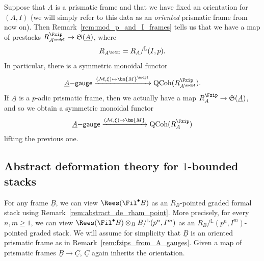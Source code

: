 \documentclass[10pt]{amsart}
\begin{document}
\begin{remark}
\label{rem:fzips_from_A_gauges}
Suppose that $\underline{A}$ is a prismatic frame and that we have fixed an orientation for $(A,I)$ (we will simply refer to this data as an \emph{oriented} prismatic frame from now on). Then Remark~\ref{rem:mod_p_and_I_frames} tells us that we have a map of prestacks $R_{A^\modpI}^{\Fzip}\to \mathfrak{S}(\underline{A})$, where 
\[
R_{A^\modpI} = R_A/{}^{\mathbb{L}}(I,p).
\]
In particular, there is a symmetric monoidal functor 
\[
\underline{A}\mathsf{-gauge}\xrightarrow{(\mathcal{M},\xi)\mapsto \bm{M}^\modpI} \mathrm{QCoh}(R_{A^\modpI}^{\Fzip}).
\]
If $\underline{A}$ is a $p$-adic prismatic frame, then we actually have a map $R_A^{\Fzip}\to \mathfrak{S}(\underline{A})$, and so we obtain a symmetric monoidal functor
\[
\underline{A}\mathsf{-gauge}\xrightarrow{(\mathcal{M},\xi)\mapsto \bm{M}} \mathrm{QCoh}(R_{A}^{\Fzip})
\]
lifting the previous one.
\end{remark}




\subsection{Abstract deformation theory for $1$-bounded stacks}
\label{subsec:abstract_def_theory} 
For any frame $\underline{B}$, we can view $\Rees(\Fil^\bullet B)$ as an  $R_B$-pointed graded formal stack using Remark~\ref{rem:abstract_de_rham_point}. More precisely, for every $n,m\ge 1$, we can view $\Rees(\Fil^\bullet B)\otimes_B B/{}^{\mathbb{L}}(p^n,I^m)$ as an $R_B/{}^{\mathbb{L}}(p^n,I^m)$-pointed graded stack. We will assume for simplicity that $\underline{B}$ is an oriented prismatic frame as in Remark~\ref{rem:fzips_from_A_gauges}. Given a map of prismatic frames $\underline{B}\to \underline{C}$, $\underline{C}$ again inherits the orientation.
\end{document}
